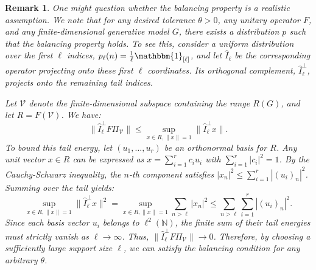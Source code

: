 \documentclass[a4paper,oneside]{amsart}
\newtheorem*{remark}{Remark}
\begin{document}
\begin{remark} 
    One might question whether the balancing property is a realistic assumption. We note that for any desired tolerance $\theta > 0$, any unitary operator $F$, and any finite-dimensional generative model $G$, there exists a distribution $p$ such that the balancing property holds. To see this, consider a uniform distribution over the first $\ell$ indices, $p_\ell(n) = \frac{1}{\ell}\mathbbm{1}_{[\ell]}$, and let $\hat{I}_\ell$ be the corresponding operator projecting onto these first $\ell$ coordinates. Its orthogonal complement, $\hat{I}_\ell^\perp$, projects onto the remaining tail indices.

    Let $\mathcal{V}$ denote the finite-dimensional subspace containing the range $R(G)$, and let $R = F(\mathcal{V})$. We have:
    \begin{equation*}
        \| \hat{I}_\ell^\perp F \Pi_{\mathcal{V}} \| \leq \sup_{x\in R, \|x\|=1} \| \hat{I}_\ell^\perp x \|.
    \end{equation*}
    To bound this tail energy, let $(u_1, \dots, u_r)$ be an orthonormal basis for $R$. Any unit vector $x \in R$ can be expressed as $x = \sum_{i=1}^r c_i u_i$ with $\sum_{i=1}^r |c_i|^2 = 1$. By the Cauchy-Schwarz inequality, the $n$-th component satisfies $|x_n|^2 \leq \sum_{i=1}^r |(u_i)_n|^2$. Summing over the tail yields:
    \begin{equation*}
        \sup_{x\in R, \|x\|=1} \| \hat{I}_\ell^\perp x \|^2 = \sup_{x\in R, \|x\|=1} \sum_{n>\ell} |x_n|^2 \leq \sum_{n>\ell} \sum_{i=1}^r |(u_i)_n|^2.
    \end{equation*}
    Since each basis vector $u_i$ belongs to $\ell^2(\mathbb{N})$, the finite sum of their tail energies must strictly vanish as $\ell \to \infty$. Thus, $\| \hat{I}_\ell^\perp F \Pi_{\mathcal{V}}\| \to 0$. Therefore, by choosing a sufficiently large support size $\ell$, we can satisfy the balancing condition for any arbitrary $\theta$.
\end{remark}
\end{document}
